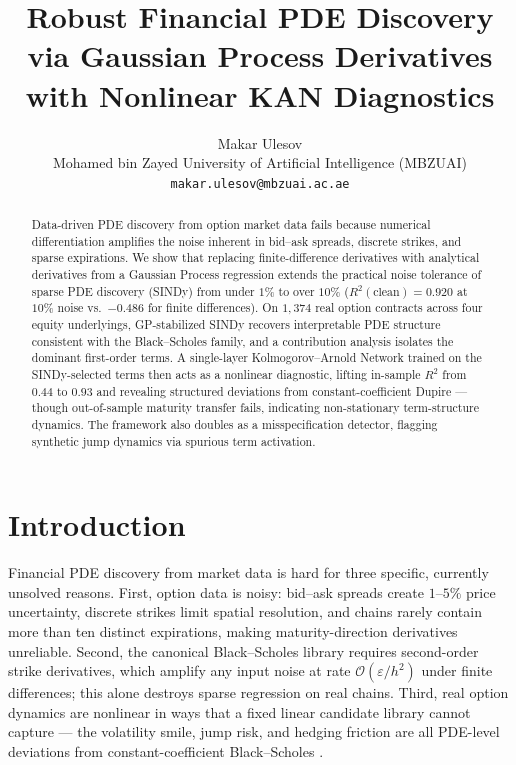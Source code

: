 \documentclass[10pt]{article}
\title{\vspace{-1.5em}\textbf{Robust Financial PDE Discovery via Gaussian Process Derivatives\\
with Nonlinear KAN Diagnostics}\vspace{-0.4em}}
\author{Makar Ulesov \\ Mohamed bin Zayed University of Artificial Intelligence (MBZUAI) \\
\texttt{makar.ulesov@mbzuai.ac.ae}}
\date{}
\begin{document}
\maketitle
\vspace{-2em}

\begin{abstract}
Data-driven PDE discovery from option market data fails because numerical differentiation amplifies the noise inherent in bid--ask spreads, discrete strikes, and sparse expirations.
We show that replacing finite-difference derivatives with analytical derivatives from a Gaussian Process regression extends the practical noise tolerance of sparse PDE discovery (SINDy) from under $1\%$ to over $10\%$ ($R^2(\text{clean}){=}0.920$ at $10\%$ noise vs.\ $-0.486$ for finite differences).
On $1{,}374$ real option contracts across four equity underlyings, GP-stabilized SINDy recovers interpretable PDE structure consistent with the Black--Scholes family, and a contribution analysis isolates the dominant first-order terms.
A single-layer Kolmogorov--Arnold Network trained on the SINDy-selected terms then acts as a nonlinear diagnostic, lifting in-sample $R^2$ from $0.44$ to $0.93$ and revealing structured deviations from constant-coefficient Dupire --- though out-of-sample maturity transfer fails, indicating non-stationary term-structure dynamics.
The framework also doubles as a misspecification detector, flagging synthetic jump dynamics via spurious term activation.
\end{abstract}

\section{Introduction}

Financial PDE discovery from market data is hard for three specific, currently unsolved reasons. First, option data is noisy: bid--ask spreads create $1$--$5\%$ price uncertainty, discrete strikes limit spatial resolution, and chains rarely contain more than ten distinct expirations, making maturity-direction derivatives unreliable. Second, the canonical Black--Scholes library requires second-order strike derivatives, which amplify any input noise at rate $\mathcal{O}(\varepsilon/h^2)$ under finite differences; this alone destroys sparse regression on real chains. Third, real option dynamics are nonlinear in ways that a fixed linear candidate library cannot capture --- the volatility smile, jump risk, and hedging friction are all PDE-level deviations from constant-coefficient Black--Scholes \citep{blackscholes1973,dupire1994pricing}.
\end{document}
